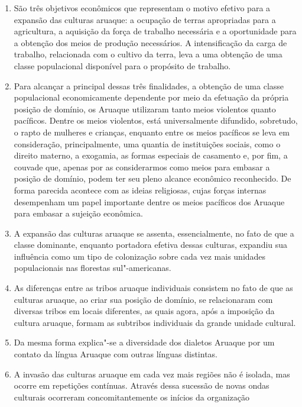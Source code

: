 \begin{enumerate}
\def\labelenumi{\arabic{enumi}.}
\setcounter{enumi}{4}
\item
  São três objetivos econômicos que representam o motivo efetivo para a
  expansão das culturas aruaque: a ocupação de terras apropriadas para a
  agricultura, a aquisição da força de trabalho necessária e a
  oportunidade para a obtenção dos meios de produção necessários. A
  intensificação da carga de trabalho, relacionada com o cultivo da
  terra, leva a uma obtenção de uma classe populacional disponível para
  o propósito de trabalho.
\item
  Para alcançar a principal dessas três finalidades, a obtenção de uma
  classe populacional economicamente dependente por meio da efetuação da
  própria posição de domínio, os Aruaque utilizaram tanto meios
  violentos quanto pacíficos. Dentre os meios violentos, está
  universalmente difundido, sobretudo, o rapto de mulheres e crianças,
  enquanto entre os meios pacíficos se leva em consideração,
  principalmente, uma quantia de instituições sociais, como o direito
  materno, a exogamia, as formas especiais de casamento e, por fim, a
  couvade que, apenas por as considerarmos como meios para embasar a
  posição de domínio, podem ter seu pleno alcance econômico reconhecido.
  De forma parecida acontece com as ideias religiosas, cujas forças
  internas desempenham um papel importante dentre os meios pacíficos
  dos Aruaque para embasar a sujeição econômica.
\item
  A expansão das culturas aruaque se assenta, essencialmente, no fato de
  que a classe dominante, enquanto portadora efetiva dessas culturas,
  expandiu sua influência como um tipo de colonização sobre cada vez
  mais unidades populacionais nas florestas sul"-americanas.
\item
  As diferenças entre as tribos aruaque individuais consistem no fato de
  que as culturas aruaque, ao criar sua posição de domínio, se
  relacionaram com diversas tribos em locais diferentes, as quais
  agora, após a imposição da cultura aruaque, formam as subtribos
  individuais da grande unidade cultural.
\item
  Da mesma forma explica"-se a diversidade dos dialetos Aruaque por um
  contato da língua Aruaque com outras línguas distintas.
\item
  A invasão das culturas aruaque em cada vez mais regiões não é isolada,
  mas ocorre em repetições contínuas. Através dessa sucessão de novas
  ondas culturais ocorreram concomitantemente os inícios da organização

\end{enumerate}
